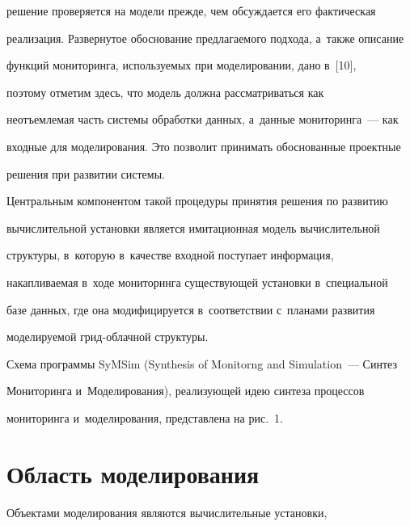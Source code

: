 решение проверяется на модели прежде, чем обсуждается его фактическая


реализация. Развернутое обоснование предлагаемого подхода, а~также описание


функций мониторинга, используемых при моделировании, дано в~[10],


поэтому отметим здесь, что модель должна рассматриваться как


неотъемлемая часть системы обработки данных, а~данные мониторинга~--- как


входные для моделирования. Это позволит принимать обоснованные проектные


решения при развитии системы.











  Центральным компонентом такой процедуры принятия решения по развитию


вычислительной установки является имитационная модель вычислительной


структуры, в~которую в~качестве входной поступает информация,


накапливаемая в~ходе мониторинга существующей установки в~специальной


базе данных, где она модифицируется в~соответствии с~планами развития


моделируемой грид-облачной структуры.





  Схема программы SyMSim (Synthesis of Monitorng and Simulation~--- Синтез


Мониторинга и~Моделирования), реализующей идею синтеза процессов


мониторинга и~моделирования, представлена на рис.~1.











\section{Область моделирования}





  Объектами моделирования являются вычислительные установки,


